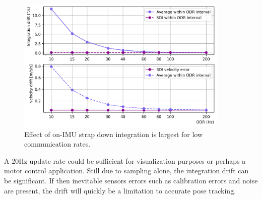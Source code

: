 \documentclass{article}
\begin{document}
\begin{figure}[ht]
\centering
\includegraphics[width=0.9\textwidth]{drift_versus_odr_frequency.png} 
\caption{Effect of on-IMU strap down integration is largest for low communication rates.}
\label{fig:effect_of_odr}
\end{figure}

A 20Hz update rate could be sufficient for visualization purposes or perhaps a motor control application. Still due to sampling alone, the integration drift can be significant. If then inevitable sensors errors such as calibration errors and noise are present, the drift will quickly be a limitation to accurate pose tracking.


\printbibliography
\end{document}
